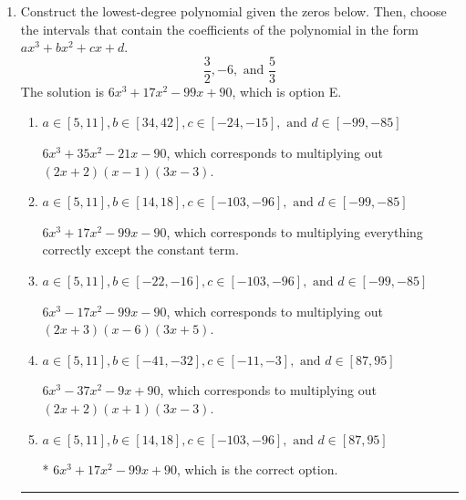 \documentclass{extbook}[14pt]
\newcommand{\litem}[1]{\item #1

\rule{\textwidth}{0.4pt}}
\begin{document}
\begin{enumerate}\litem{
Construct the lowest-degree polynomial given the zeros below. Then, choose the intervals that contain the coefficients of the polynomial in the form $ax^3+bx^2+cx+d$.
\[ \frac{3}{2}, -6, \text{ and } \frac{5}{3} \]
The solution is \( 6x^{3} +17 x^{2} -99 x + 90 \), which is option E.\begin{enumerate}[label=\Alph*.]
\item \( a \in [5, 11], b \in [34, 42], c \in [-24, -15], \text{ and } d \in [-99, -85] \)

$6x^{3} +35 x^{2} -21 x -90$, which corresponds to multiplying out $(2x + 2)(x -1)(3x -3)$.
\item \( a \in [5, 11], b \in [14, 18], c \in [-103, -96], \text{ and } d \in [-99, -85] \)

$6x^{3} +17 x^{2} -99 x -90$, which corresponds to multiplying everything correctly except the constant term.
\item \( a \in [5, 11], b \in [-22, -16], c \in [-103, -96], \text{ and } d \in [-99, -85] \)

$6x^{3} -17 x^{2} -99 x -90$, which corresponds to multiplying out $(2x + 3)(x -6)(3x + 5)$.
\item \( a \in [5, 11], b \in [-41, -32], c \in [-11, -3], \text{ and } d \in [87, 95] \)

$6x^{3} -37 x^{2} -9 x + 90$, which corresponds to multiplying out $(2x + 2)(x + 1)(3x -3)$.
\item \( a \in [5, 11], b \in [14, 18], c \in [-103, -96], \text{ and } d \in [87, 95] \)

* $6x^{3} +17 x^{2} -99 x + 90$, which is the correct option.
\end{enumerate}

}
\end{enumerate}
\end{document}
